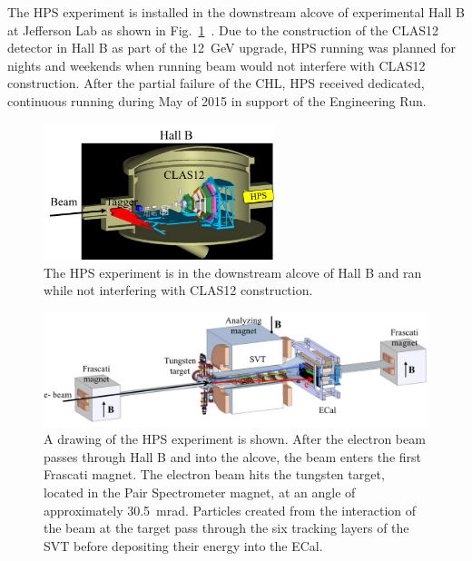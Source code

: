 The HPS experiment is installed in the downstream alcove of experimental Hall B at Jefferson Lab as shown in Fig.~\ref{Figure:hallB}~\cite{beamline_nim_2017}. Due to the construction of the CLAS12 detector in Hall B as part of the 12~GeV upgrade, HPS running was planned for nights and weekends when running beam would not interfere with CLAS12 construction. After the partial failure of the CHL, HPS received dedicated, continuous running during May of 2015 in support of the Engineering Run. 

\begin{figure}[htb]
  \centering
      \includegraphics[width=0.6\textwidth]{pics/experiment/hallB.png}
  \caption[HPS location in Hall B]{The HPS experiment is in the downstream alcove of Hall B and ran while not interfering with CLAS12 construction.}
  \label{Figure:hallB}
\end{figure}

\begin{figure}[htb]
  \centering
      \includegraphics[width=1.0\textwidth]{pics/experiment/hpsBeamline.png}
  \caption[HPS beamline]{A drawing of the HPS experiment is shown. After the electron beam passes through Hall B and into the alcove, the beam enters the first Frascati magnet. The electron beam hits the tungsten target, located in the Pair Spectrometer magnet, at an angle of approximately 30.5~mrad. Particles created from the interaction of the beam at the target pass through the six tracking layers of the SVT before depositing their energy into the ECal.}
  \label{Figure:hpsBeamline}
\end{figure}


